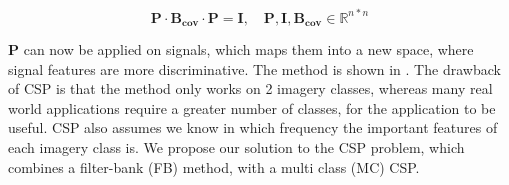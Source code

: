 \begin{equation}
\label{eq:diagonalization_B}
\pmb{P} \cdot \pmb{B_{cov}} \cdot \pmb{P} = \pmb{I}, \quad \pmb{P}, \pmb{I}, \pmb{B_{cov}} \in \mathbb{R}^{n*n}
\end{equation}

$\pmb{P}$ can now be applied  on signals, which maps them into a new space, where signal features are more discriminative. The method is shown in .  The drawback of CSP is that the method only works on 2 imagery classes, whereas many real world applications require a greater number of classes, for the application to be useful. CSP also assumes we know in which frequency the important features of each imagery class is.
We propose our solution to the CSP problem, which combines a filter-bank (FB) method, with a multi class (MC) CSP.


